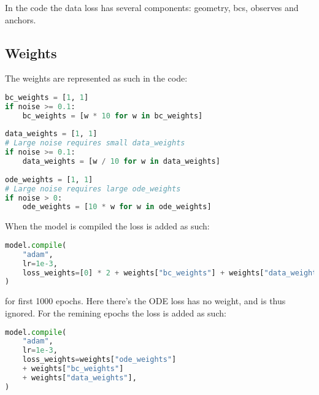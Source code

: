 \documentclass[a4paper]{article}
\begin{document}
In the code the data loss has several components: geometry, bcs, observes and anchors. 




\subsection{Weights}

The weights are represented as such in the code:
\begin{lstlisting}[language=python]
bc_weights = [1, 1]
if noise >= 0.1:
	bc_weights = [w * 10 for w in bc_weights]
	
data_weights = [1, 1]
# Large noise requires small data_weights
if noise >= 0.1:
	data_weights = [w / 10 for w in data_weights]
	
ode_weights = [1, 1]
# Large noise requires large ode_weights
if noise > 0:
	ode_weights = [10 * w for w in ode_weights]
\end{lstlisting}

When the model is compiled the loss is added as such:
\begin{lstlisting}[language=python]
model.compile(
	"adam",
	lr=1e-3,
	loss_weights=[0] * 2 + weights["bc_weights"] + weights["data_weights"],
)
\end{lstlisting}
for first 1000 epochs. Here there's the ODE loss has no weight, and is thus ignored. 
For the remining epochs the loss is added as such:
\begin{lstlisting}[language=python]
model.compile(
	"adam",
	lr=1e-3,
	loss_weights=weights["ode_weights"]
	+ weights["bc_weights"]
	+ weights["data_weights"],
)
\end{lstlisting}
















	
\end{document}
